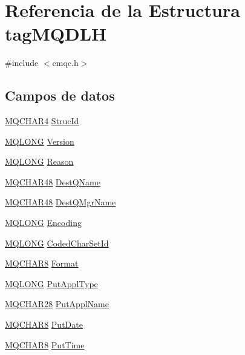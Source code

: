 \hypertarget{structtag_m_q_d_l_h}{}\section{Referencia de la Estructura tag\+M\+Q\+D\+L\+H}
\label{structtag_m_q_d_l_h}


{\ttfamily \#include $<$cmqc.\+h$>$}

\subsection*{Campos de datos}
\begin{DoxyCompactItemize}
\item 
\hyperlink{cmqc_8h_a12590e546ed66fda7cf21c1d5cefa31d}{M\+Q\+C\+H\+A\+R4} \hyperlink{structtag_m_q_d_l_h_a0530922ca944569b52601d74941f96e4}{Struc\+Id}
\item 
\hyperlink{cmqc_8h_a1fb8d28cbda3fa8766a9821230cdb6d5}{M\+Q\+L\+O\+N\+G} \hyperlink{structtag_m_q_d_l_h_a0656ef8f766b3907d394d88a35d7b7e9}{Version}
\item 
\hyperlink{cmqc_8h_a1fb8d28cbda3fa8766a9821230cdb6d5}{M\+Q\+L\+O\+N\+G} \hyperlink{structtag_m_q_d_l_h_ac2f0378cb0c66c5f91625822e53d7bae}{Reason}
\item 
\hyperlink{cmqc_8h_a53b1a2836da03f19144836725ff77919}{M\+Q\+C\+H\+A\+R48} \hyperlink{structtag_m_q_d_l_h_a90aa2a325ec2520d431f1924f7cf5cf0}{Dest\+Q\+Name}
\item 
\hyperlink{cmqc_8h_a53b1a2836da03f19144836725ff77919}{M\+Q\+C\+H\+A\+R48} \hyperlink{structtag_m_q_d_l_h_a146f52cd7bae6a5b36ec1314f079ffb2}{Dest\+Q\+Mgr\+Name}
\item 
\hyperlink{cmqc_8h_a1fb8d28cbda3fa8766a9821230cdb6d5}{M\+Q\+L\+O\+N\+G} \hyperlink{structtag_m_q_d_l_h_a30167bf454a49a60fd3fe4e9e586af34}{Encoding}
\item 
\hyperlink{cmqc_8h_a1fb8d28cbda3fa8766a9821230cdb6d5}{M\+Q\+L\+O\+N\+G} \hyperlink{structtag_m_q_d_l_h_a4d8d1961a991850d1355cdf9b4680b8e}{Coded\+Char\+Set\+Id}
\item 
\hyperlink{cmqc_8h_abddcedb8c41fa262f2bd05dfec3e60a5}{M\+Q\+C\+H\+A\+R8} \hyperlink{structtag_m_q_d_l_h_a435a478822008713f8aaff89f369ed63}{Format}
\item 
\hyperlink{cmqc_8h_a1fb8d28cbda3fa8766a9821230cdb6d5}{M\+Q\+L\+O\+N\+G} \hyperlink{structtag_m_q_d_l_h_a6d9e0e0fe9075017c939213948c747dc}{Put\+Appl\+Type}
\item 
\hyperlink{cmqc_8h_a6139f35ea8f9711726daeb5df27ab593}{M\+Q\+C\+H\+A\+R28} \hyperlink{structtag_m_q_d_l_h_a7195390be27f384ef0ab0d0f9053d462}{Put\+Appl\+Name}
\item 
\hyperlink{cmqc_8h_abddcedb8c41fa262f2bd05dfec3e60a5}{M\+Q\+C\+H\+A\+R8} \hyperlink{structtag_m_q_d_l_h_add3e7fe139edfa323295d6c7bc764cc5}{Put\+Date}
\item 
\hyperlink{cmqc_8h_abddcedb8c41fa262f2bd05dfec3e60a5}{M\+Q\+C\+H\+A\+R8} \hyperlink{structtag_m_q_d_l_h_aec51e7b9face9480a893ae5d47781ee7}{Put\+Time}
\end{DoxyCompactItemize}


